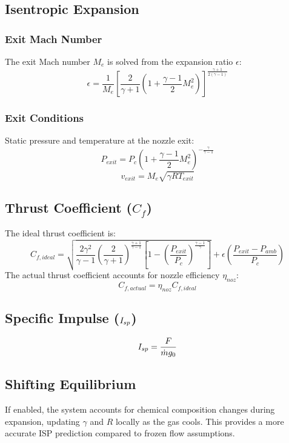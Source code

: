 \subsection{Isentropic Expansion}

\subsubsection{Exit Mach Number}
The exit Mach number $M_e$ is solved from the expansion ratio $\epsilon$:
\begin{equation}
\epsilon = \frac{1}{M_e} \left[\frac{2}{\gamma+1} \left(1 + \frac{\gamma-1}{2} M_e^2\right)\right]^{\frac{\gamma+1}{2(\gamma-1)}}
\end{equation}

\subsubsection{Exit Conditions}
Static pressure and temperature at the nozzle exit:
\begin{equation}
P_{exit} = P_c \left(1 + \frac{\gamma-1}{2} M_e^2\right)^{-\frac{\gamma}{\gamma-1}}
\end{equation}
\begin{equation}
v_{exit} = M_e \sqrt{\gamma R T_{exit}}
\end{equation}

\subsection{Thrust Coefficient ($C_f$)}
The ideal thrust coefficient is:
\begin{equation}
C_{f,ideal} = \sqrt{\frac{2\gamma^2}{\gamma-1} \left(\frac{2}{\gamma+1}\right)^{\frac{\gamma+1}{\gamma-1}} \left[1 - \left(\frac{P_{exit}}{P_c}\right)^{\frac{\gamma-1}{\gamma}}\right]} + \epsilon \left(\frac{P_{exit} - P_{amb}}{P_c}\right)
\end{equation}
The actual thrust coefficient accounts for nozzle efficiency $\eta_{noz}$:
\begin{equation}
C_{f,actual} = \eta_{noz} C_{f,ideal}
\end{equation}

\subsection{Specific Impulse ($I_{sp}$)}
\begin{equation}
I_{sp} = \frac{F}{\dot{m} g_0}
\end{equation}

\subsection{Shifting Equilibrium}
If enabled, the system accounts for chemical composition changes during expansion, updating $\gamma$ and $R$ locally as the gas cools. This provides a more accurate ISP prediction compared to frozen flow assumptions.
